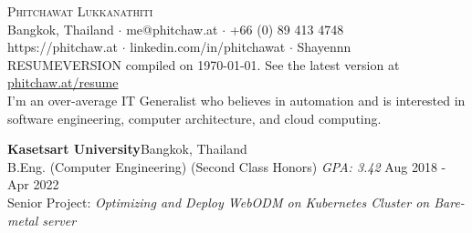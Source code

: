 \vspace*{-40pt}
\vspace*{-10pt}
\begin{center}
	{\Huge \scshape {Phitchawat Lukkanathiti}}\\
	\faMapMarker \vspace{0.4mm} Bangkok, Thailand $\cdot$ \faEnvelope \vspace{0.4mm} me@phitchaw.at $\cdot$ \faPhone \vspace{0.4mm} +66 (0) 89 413 4748 \\
  \faGlobe \vspace{0.4mm} https://phitchaw.at $\cdot$ \faLinkedinSquare \vspace{0.4mm} linkedin.com/in/phitchawat $\cdot$ \faGithub \vspace{0.4mm} Shayennn\\
\vspace{-2mm}
{\tiny{RESUMEVERSION compiled on \today. See the latest version at \href{https://github.com/Shayennn/resume/releases/latest/download/Phitchawat_Lukkanathiti_Resume_with_transcript.pdf}{phitchaw.at/resume}}}\\
\vspace{2mm}
        I'm an over-average IT Generalist who believes in automation and is interested in software engineering, computer architecture, and cloud computing.
\end{center}
\vspace{2mm}

\textbf{Kasetsart University}\hfill Bangkok, Thailand\\
B.Eng. (Computer Engineering) (Second Class Honors) \textit{GPA: 3.42} \hfill Aug 2018 - Apr 2022\\
Senior Project: \textit{Optimizing and Deploy WebODM on Kubernetes Cluster on Bare-metal server}\\
\vspace{2mm}

\vspace{1mm}

